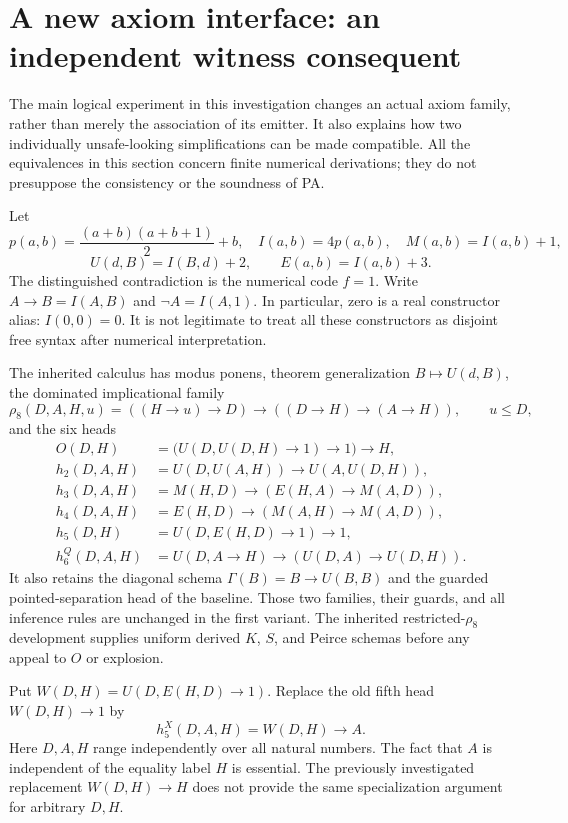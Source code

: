 \section{A new axiom interface: an independent witness consequent}
\label{sec:witness}

The main logical experiment in this investigation changes an actual axiom
family, rather than merely the association of its emitter.  It also explains
how two individually unsafe-looking simplifications can be made compatible.
All the equivalences in this section concern finite numerical derivations;
they do not presuppose the consistency or the soundness of PA.

Let
\[
 p(a,b)=\frac{(a+b)(a+b+1)}2+b,\quad
 I(a,b)=4p(a,b),\quad M(a,b)=I(a,b)+1,
\]
\[
 U(d,B)=I(B,d)+2,\qquad E(a,b)=I(a,b)+3.
\]
The distinguished contradiction is the numerical code $f=1$.  Write
$A\to B=I(A,B)$ and $\neg A=I(A,1)$.  In particular, zero is a real
constructor alias: $I(0,0)=0$.  It is not legitimate to treat all these
constructors as disjoint free syntax after numerical interpretation.

The inherited calculus has modus ponens, theorem generalization
$B\mapsto U(d,B)$, the dominated implicational family
\[
 \rho_8(D,A,H,u)=((H\to u)\to D)\to((D\to H)\to(A\to H)),
 \qquad u\leq D,
\]
and the six heads
\begin{align*}
 O(D,H)&=\bigl(U(D,U(D,H)\to1)\to1\bigr)\to H,\\
 h_2(D,A,H)&=U(D,U(A,H))\to U(A,U(D,H)),\\
 h_3(D,A,H)&=M(H,D)\to(E(H,A)\to M(A,D)),\\
 h_4(D,A,H)&=E(H,D)\to(M(A,H)\to M(A,D)),\\
 h_5(D,H)&=U(D,E(H,D)\to1)\to1,\\
 h_6^Q(D,A,H)&=U(D,A\to H)\to(U(D,A)\to U(D,H)).
\end{align*}
It also retains the diagonal schema $\Gamma(B)=B\to U(B,B)$ and the
guarded pointed-separation head of the baseline.  Those two families,
their guards, and all inference rules are unchanged in the first variant.
The inherited restricted-$\rho_8$ development supplies uniform derived
$K$, $S$, and Peirce schemas before any appeal to $O$ or explosion.

Put $W(D,H)=U(D,E(H,D)\to1)$.  Replace the old fifth head $W(D,H)\to1$
by
\begin{equation}
             h_5^X(D,A,H)=W(D,H)\to A. \label{eq:h5X}
\end{equation}
Here $D,A,H$ range independently over all natural numbers.  The fact that
$A$ is independent of the equality label $H$ is essential.  The previously
investigated replacement $W(D,H)\to H$ does not provide the same
specialization argument for arbitrary $D,H$.

